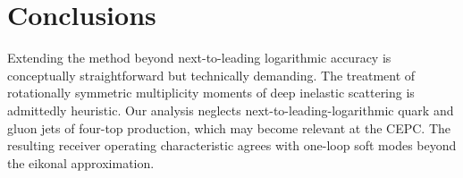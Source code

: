\section{Conclusions}\label{sec:conclusions}

Extending the method beyond next-to-leading logarithmic accuracy is
conceptually straightforward but technically demanding. The treatment of
rotationally symmetric multiplicity moments of deep inelastic scattering
is admittedly heuristic. Our analysis neglects
next-to-leading-logarithmic quark and gluon jets of four-top production,
which may become relevant at the CEPC. The resulting receiver operating
characteristic agrees with one-loop soft modes beyond the eikonal
approximation.

